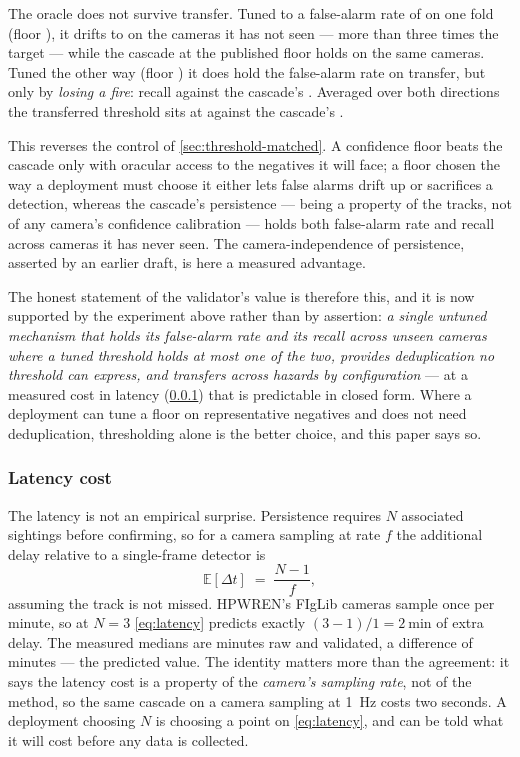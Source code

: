 The oracle does not survive transfer. Tuned to a false-alarm rate of
\TransferTrainFAR{} on one fold (floor \TransferTunedFloor), it drifts to
\TransferTestFAR{} on the cameras it has not seen — more than three times the
target — while the cascade at the published floor holds \TransferCascadeFAR{}
on the same cameras. Tuned the other way (floor \TransferBATunedFloor) it
does hold the false-alarm rate on transfer, but only by \emph{losing a fire}:
recall \TransferBARecall{} against the cascade's \TransferBACascadeRecall.
Averaged over both directions the transferred threshold sits at
\TransferMeanThresholdFAR{} against the cascade's \TransferMeanCascadeFAR.

This reverses the control of \cref{sec:threshold-matched}. A confidence floor
beats the cascade only with oracular access to the negatives it will face; a
floor chosen the way a deployment must choose it either lets false alarms
drift up or sacrifices a detection, whereas the cascade's persistence — being
a property of the tracks, not of any camera's confidence calibration — holds
both false-alarm rate and recall across cameras it has never seen. The
camera-independence of persistence, asserted by an earlier draft, is here a
measured advantage.

The honest statement of the validator's value is therefore this, and it is
now supported by the experiment above rather than by assertion: \emph{a
single untuned mechanism that holds its false-alarm rate and its recall
across unseen cameras where a tuned threshold holds at most one of the two,
provides deduplication no threshold can express, and transfers across hazards
by configuration} — at a measured cost in latency (\cref{sec:latency}) that
is predictable in closed form.
Where a deployment can tune a floor on representative negatives and does not
need deduplication, thresholding alone is the better choice, and this paper
says so.

\subsubsection{Latency cost}
\label{sec:latency}

The latency is not an empirical surprise. Persistence requires $N$ associated
sightings before confirming, so for a camera sampling at rate $f$ the
additional delay relative to a single-frame detector is
\begin{equation}
  \mathbb{E}[\Delta t] \;=\; \frac{N - 1}{f},
  \label{eq:latency}
\end{equation}
assuming the track is not missed. HPWREN's FIgLib cameras sample once per
minute, so at $N = 3$ \cref{eq:latency} predicts exactly
$(3-1)/1 = \SI{2}{\minute}$ of extra delay. The measured medians are
\RawMinutesToDetect{} minutes raw and \MedianMinutesToDetect{} validated, a
difference of \AddedMinutesToDetect{} minutes — the predicted value. The
identity matters more than the agreement: it says the latency cost is a
property of the \emph{camera's sampling rate}, not of the method, so the same
cascade on a camera sampling at \SI{1}{\hertz} costs two seconds. A deployment
choosing $N$ is choosing a point on \cref{eq:latency}, and can be told what it
will cost before any data is collected.

